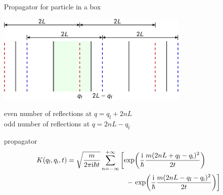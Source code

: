 \documentclass[t,dvipsnames]{beamer}
\begin{document}
\begin{frame}[t]{Propagator for particle in a box}

 \vspace{-0.3truecm}
 \begin{center}
  \includegraphics[width=0.7\textwidth]{images}
 \end{center}

 \textcolor{red!60!black}{even number of reflections at $q = q_\text{f}+2nL$}\\
 \textcolor{blue!60!black}{odd number of reflections at $q = 2nL-q_\text{f}$}

 \vspace{0.3truecm}
 propagator
 \begin{displaymath}
  \begin{aligned}
   K(q_\text{f}, q_\text{i}, t) &= \sqrt{\frac{m}{2\pi\text{i}\hbar t}}\sum_{n=-\infty}^{+\infty}
    \left[\exp\!\left(\frac{\text{i}}{\hbar}
	  \frac{m(2nL+q_\text{f}-q_\text{i})^2}{2t}\right)\right.\\
    &\hspace{3truecm}-\left.\exp\!\left(\frac{\text{i}}{\hbar}
	  \frac{m(2nL-q_\text{f}-q_\text{i})^2}{2t}\right)\right]
  \end{aligned}
 \end{displaymath}
\end{frame}
\end{document}
